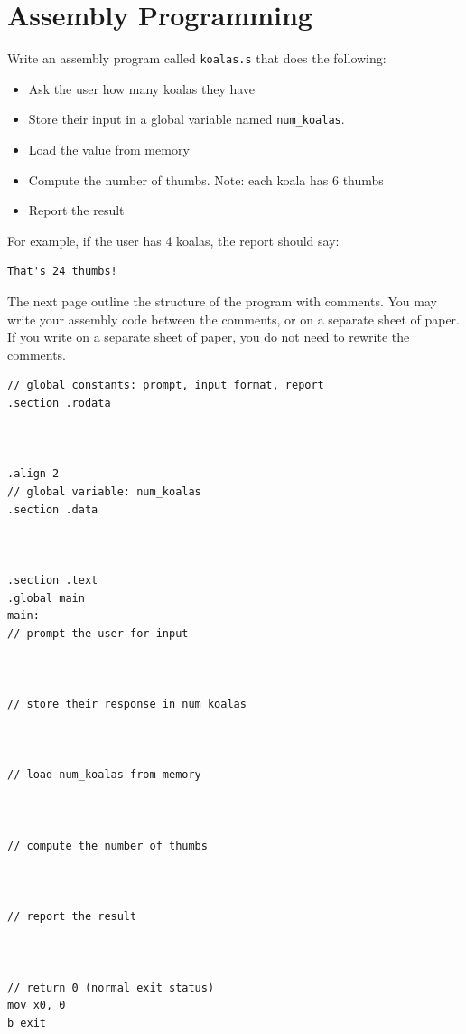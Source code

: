 \documentclass[12pt]{article}
\begin{document}
\vfill

\standardsfooter


\newpage

\section*{Assembly Programming}


Write an assembly program called \texttt{koalas.s} that does the following:
\begin{itemize}
\item Ask the user how many koalas they have
\item Store their input in a global variable named \texttt{num\_koalas}.
\item Load the value from memory
\item Compute the number of thumbs. Note: each koala has 6 thumbs
\item Report the result
\end{itemize}

For example, if the user has 4 koalas, the report should say:
\begin{verbatim}
That's 24 thumbs!
\end{verbatim}

The next page outline the structure of the program with comments. You may write your assembly code between the comments, or on a separate sheet of paper. If you write on a separate sheet of paper, you do not need to rewrite the comments.

\vfill

\standardsfooter

\newpage

\begin{verbatim}
// global constants: prompt, input format, report
.section .rodata



.align 2
// global variable: num_koalas
.section .data



.section .text
.global main
main:
// prompt the user for input



// store their response in num_koalas



// load num_koalas from memory



// compute the number of thumbs



// report the result



// return 0 (normal exit status)
mov x0, 0
b exit
\end{verbatim}


\end{document}
